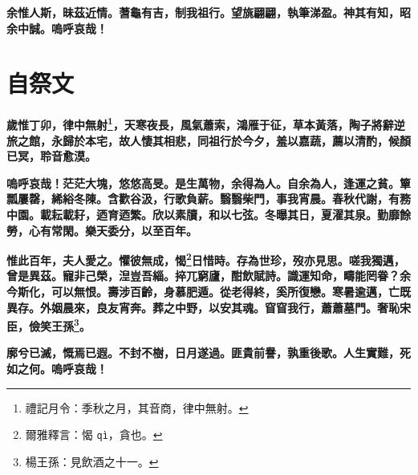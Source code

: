 \textbf{余惟人斯，昧茲近情。蓍龜有吉，制我祖行。望旐翩翩，執筆涕盈。神其有知，昭余中誠。嗚呼哀哉！}

\section{自祭文}

\textbf{歲惟丁卯，律中無射\footnote{禮記月令：季秋之月，其音商，律中無射。}，天寒夜長，風氣蕭索，鴻雁于征，草本黃落，陶子將辭逆旅之館，永歸於本宅，故人悽其相悲，同祖行於今夕，羞以嘉蔬，薦以清酌，候顏已冥，聆音愈漠。}

\textbf{嗚呼哀哉！茫茫大塊，悠悠高旻。是生萬物，余得為人。自余為人，逢運之貧。簞瓢屢罄，絺綌冬陳。含歡谷汲，行歌負薪。翳翳柴門，事我宵晨。春秋代謝，有務中園。載耘載耔，迺育迺繁。欣以素牘，和以七弦。冬曝其日，夏濯其泉。勤靡餘勞，心有常閑。樂天委分，以至百年。}

\textbf{惟此百年，夫人愛之。懼彼無成，愒\footnote{爾雅釋言：愒 \texttt{qì}，貪也。}日惜時。存為世珍，歿亦見思。嗟我獨邁，曾是異茲。寵非己榮，湼豈吾緇。捽兀窮廬，酣飲賦詩。識運知命，疇能罔眷？余今斯化，可以無恨。壽涉百齡，身慕肥遁。從老得終，奚所復戀。寒暑逾邁，亡既異存。外姻晨來，良友宵奔。葬之中野，以安其魂。窅窅我行，蕭蕭墓門。奢恥宋臣，儉笑王孫\footnote{楊王孫：見飲酒之十一。}。}

\textbf{廓兮已滅，慨焉已遐。不封不樹，日月遂過。匪貴前譽，孰重後歌。人生實難，死如之何。嗚呼哀哉！}

